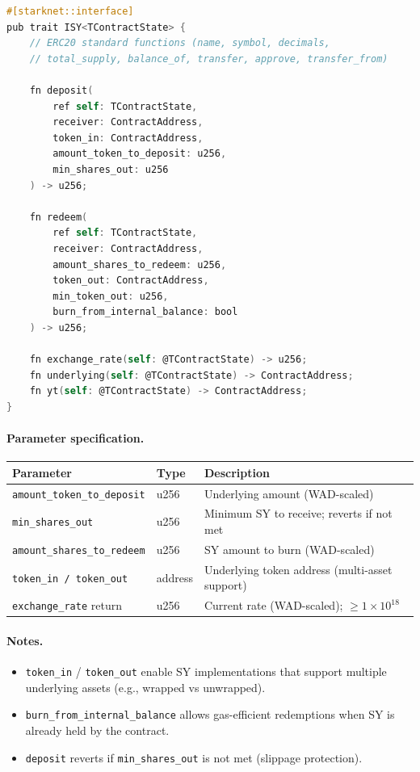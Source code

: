 \begin{lstlisting}[language=C,basicstyle=\ttfamily\small,frame=single,breaklines=true,columns=fullflexible]
#[starknet::interface]
pub trait ISY<TContractState> {
    // ERC20 standard functions (name, symbol, decimals,
    // total_supply, balance_of, transfer, approve, transfer_from)

    fn deposit(
        ref self: TContractState,
        receiver: ContractAddress,
        token_in: ContractAddress,
        amount_token_to_deposit: u256,
        min_shares_out: u256
    ) -> u256;

    fn redeem(
        ref self: TContractState,
        receiver: ContractAddress,
        amount_shares_to_redeem: u256,
        token_out: ContractAddress,
        min_token_out: u256,
        burn_from_internal_balance: bool
    ) -> u256;

    fn exchange_rate(self: @TContractState) -> u256;
    fn underlying(self: @TContractState) -> ContractAddress;
    fn yt(self: @TContractState) -> ContractAddress;
}
\end{lstlisting}

\paragraph{Parameter specification.}
\begin{center}
\begin{tabular}{l l l}
\toprule
\textbf{Parameter} & \textbf{Type} & \textbf{Description} \\
\midrule
\texttt{amount\_token\_to\_deposit} & u256 & Underlying amount (WAD-scaled) \\
\texttt{min\_shares\_out} & u256 & Minimum SY to receive; reverts if not met \\
\texttt{amount\_shares\_to\_redeem} & u256 & SY amount to burn (WAD-scaled) \\
\texttt{token\_in / token\_out} & address & Underlying token address (multi-asset support) \\
\texttt{exchange\_rate} return & u256 & Current rate (WAD-scaled); $\geq 1 \times 10^{18}$ \\
\bottomrule
\end{tabular}
\end{center}

\paragraph{Notes.}
\begin{itemize}
\item \texttt{token\_in} / \texttt{token\_out} enable SY implementations that support multiple underlying assets (e.g., wrapped vs unwrapped).
\item \texttt{burn\_from\_internal\_balance} allows gas-efficient redemptions when SY is already held by the contract.
\item \texttt{deposit} reverts if \texttt{min\_shares\_out} is not met (slippage protection).
\end{itemize}


